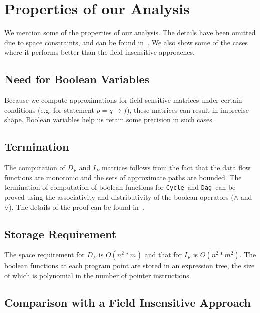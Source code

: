 \documentclass[letterpaper]{sig-alternate}
\newcommand{\p}{\ensuremath{p}}
\newcommand{\q}{\ensuremath{q}}
\newcommand{\Dag}{{\tt Dag}}
\newcommand{\Cycle}{{\tt Cycle}}
\begin{document}
\section{Properties of our Analysis}\label{sec:props}
We mention some of the properties of our analysis. The
details have been omitted due to space constraints, and can
be found in~\cite{Sandeep11thesis}. We also show some
of the cases where it performs better than the field
insensitive approaches.
\subsection{Need for Boolean Variables}
Because we compute approximations for field sensitive
matrices under certain conditions (e.g. for statement $\p =
\q\rightarrow f$), these matrices can result in imprecise
shape. Boolean variables help us retain some precision in
such cases.
\subsection{Termination} \label{Termination_Criteria}

The computation of $D_F$ and $I_F$ matrices follows from the
fact that the data flow functions are monotonic and the sets
of approximate paths are bounded. The termination of
computation of boolean functions for \Cycle\ and \Dag\ can be
proved using the associativity and distributivity of the
boolean operators ($\wedge$ and $\vee$). The details
  of the proof can be found in~\cite{Sandeep11thesis}.
\subsection{Storage Requirement}
The space requirement for $D_F$ is $O(n^{2}* m)$ and that for
$I_F$ is $O(n^{2}* m^2)$. The boolean functions at each
program point are stored in an expression tree, the size of
which is polynomial in the number of pointer instructions.

\subsection{Comparison with a Field Insensitive Approach}
\end{document}
